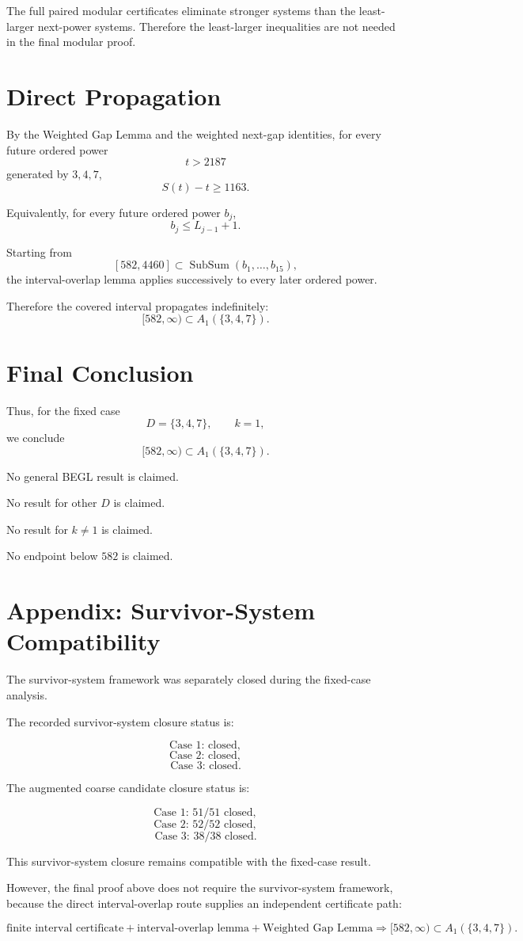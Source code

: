 \documentclass[11pt]{article}
\newcommand{\SubSum}{\operatorname{SubSum}}
\begin{document}
The full paired modular certificates eliminate stronger systems than the least-larger next-power systems. Therefore the least-larger inequalities are not needed in the final modular proof.

\section{Direct Propagation}

By the Weighted Gap Lemma and the weighted next-gap identities, for every future ordered power
\[
t>2187
\]
generated by \(3,4,7\),
\[
S(t)-t\ge1163.
\]

Equivalently, for every future ordered power \(b_j\),
\[
b_j\le L_{j-1}+1.
\]

Starting from
\[
[582,4460]\subset \SubSum(b_1,\ldots,b_{15}),
\]
the interval-overlap lemma applies successively to every later ordered power.

Therefore the covered interval propagates indefinitely:
\[
[582,\infty)\subset A_1(\{3,4,7\}).
\]

\section{Final Conclusion}

Thus, for the fixed case
\[
D=\{3,4,7\},\qquad k=1,
\]
we conclude
\[
[582,\infty) \subset A_1(\{3,4,7\}).
\]

No general BEGL result is claimed.

No result for other \(D\) is claimed.

No result for \(k\ne1\) is claimed.

No endpoint below \(582\) is claimed.

\section{Appendix: Survivor-System Compatibility}

The survivor-system framework was separately closed during the fixed-case analysis.

The recorded survivor-system closure status is:

\[
\text{Case 1: closed},
\]
\[
\text{Case 2: closed},
\]
\[
\text{Case 3: closed}.
\]

The augmented coarse candidate closure status is:

\[
\text{Case 1: }51/51\text{ closed},
\]
\[
\text{Case 2: }52/52\text{ closed},
\]
\[
\text{Case 3: }38/38\text{ closed}.
\]

This survivor-system closure remains compatible with the fixed-case result.

However, the final proof above does not require the survivor-system framework, because the direct interval-overlap route supplies an independent certificate path:

\[
\text{finite interval certificate}
+
\text{interval-overlap lemma}
+
\text{Weighted Gap Lemma}
\Longrightarrow
[582,\infty)\subset A_1(\{3,4,7\}).
\]
\end{document}
